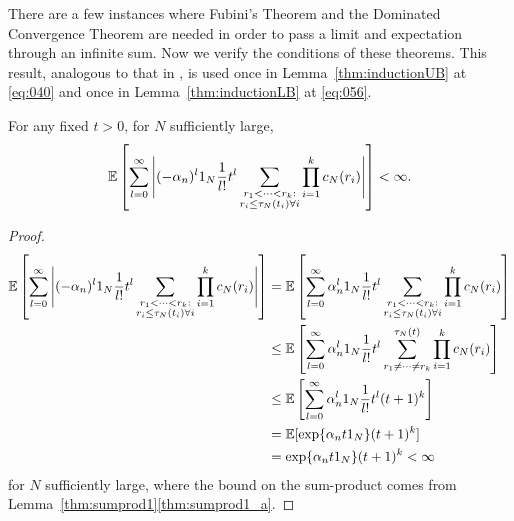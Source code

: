 There are a few instances where Fubini's Theorem and the Dominated Convergence Theorem are needed in order to pass a limit and expectation through an infinite sum.
Now we verify the conditions of these theorems.
This result, analogous to that in \textcite[Appendix]{koskela2018}, is used once
in Lemma~\ref{thm:inductionUB} at \eqref{eq:040} and once in Lemma~\ref{thm:inductionLB} at \eqref{eq:056}.
\begin{lemma}\label{thm:DCT_Fubini}
For any fixed $t>0$, for $N$ sufficiently large,
\begin{equation*}
\mathbb{E} \left[ \sum_{l=0}^\infty \Bigg| (-\alpha_n)^l 1_N \frac{1}{l!} t^l 
        \sum_{\substack{r_1 < \cdots < r_k : \\ r_i \leq \tau_N(t_i) \forall i}}
        \prod_{i=1}^k c_N(r_i) \Bigg| \right]
< \infty .
\end{equation*}
\end{lemma}

\begin{proof}
\begin{align*}
\mathbb{E} \left[ \sum_{l=0}^\infty \Bigg| (-\alpha_n)^l 1_N \frac{1}{l!} t^l 
        \sum_{\substack{r_1 < \cdots < r_k : \\ r_i \leq \tau_N(t_i) \forall i}}
        \prod_{i=1}^k c_N(r_i) \Bigg| \right]
&= \mathbb{E} \left[ \sum_{l=0}^\infty \alpha_n^l 1_N \frac{1}{l!} t^l 
        \sum_{\substack{r_1 < \cdots < r_k : \\ r_i \leq \tau_N(t_i) \forall i}}
        \prod_{i=1}^k c_N(r_i) \right] \\
&\leq \mathbb{E} \left[ \sum_{l=0}^\infty \alpha_n^l 1_N \frac{1}{l!} t^l 
        \sum_{r_1 \neq \cdots \neq r_k}^{\tau_N(t)}
        \prod_{i=1}^k c_N(r_i) \right] \\        
&\leq \mathbb{E} \left[ \sum_{l=0}^\infty \alpha_n^l 1_N \frac{1}{l!} t^l 
        (t+1)^k \right] \\
&= \mathbb{E}[ \exp\{ \alpha_n t 1_N \} (t+1)^k ]\\
&= \exp\{ \alpha_n t 1_N \} (t+1)^k
< \infty 
\end{align*}
for $N$ sufficiently large,
where the bound on the sum-product comes from Lemma~\ref{thm:sumprod1}\ref{thm:sumprod1_a}.
\end{proof}



